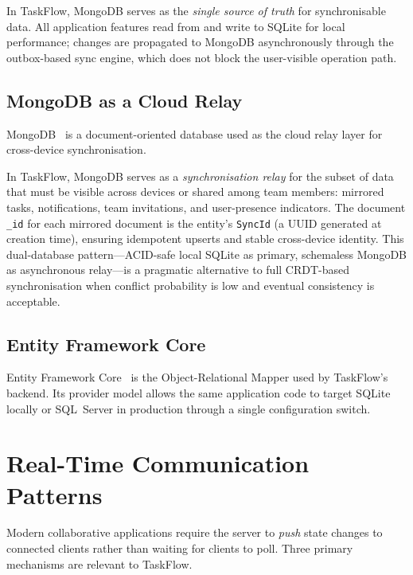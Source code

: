 In TaskFlow, MongoDB serves as the \emph{single source of truth} for synchronisable data.
All application features read from and write to SQLite for local performance;
changes are propagated to MongoDB asynchronously through the outbox-based sync engine,
which does not block the user-visible operation path.

\subsection*{MongoDB as a Cloud Relay}

MongoDB~\cite{chodorow2013mongodb} is a document-oriented database used as
the cloud relay layer for cross-device synchronisation.

In TaskFlow, MongoDB serves as a \emph{synchronisation relay} for the subset of data
that must be visible across devices or shared among team members: mirrored tasks,
notifications, team invitations, and user-presence indicators.
The document \texttt{\_id} for each mirrored document is the entity's \texttt{SyncId}
(a UUID generated at creation time), ensuring idempotent upserts and stable cross-device
identity.
This dual-database pattern---ACID-safe local SQLite as primary, schemaless MongoDB as
asynchronous relay---is a pragmatic alternative to full CRDT-based synchronisation when
conflict probability is low and eventual consistency is acceptable.

\subsection*{Entity Framework Core}

Entity Framework Core~\cite{efcoredocs2024} is the Object-Relational Mapper
used by TaskFlow's backend. Its provider model allows the same application
code to target SQLite locally or SQL~Server in production through a single
configuration switch.

\section{Real-Time Communication Patterns}\label{sec:bg_realtime}

Modern collaborative applications require the server to \emph{push} state changes to
connected clients rather than waiting for clients to poll.
Three primary mechanisms are relevant to TaskFlow.

